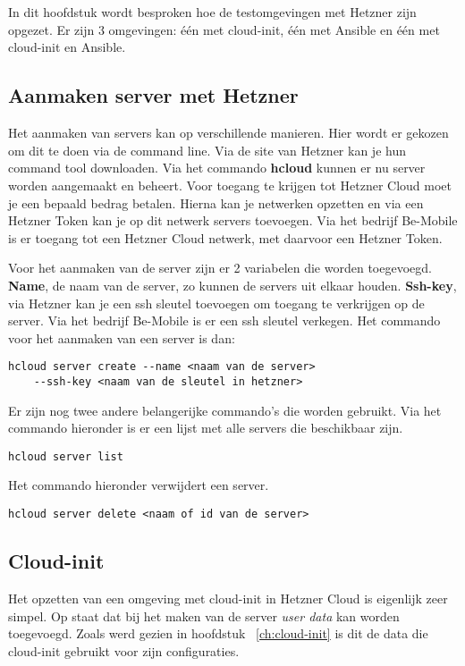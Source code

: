 \chapter{}
\label{ch:testhetzner}
In dit hoofdstuk wordt besproken hoe de testomgevingen met Hetzner zijn opgezet. Er zijn 3 omgevingen: één met cloud-init, één met Ansible en één met cloud-init en Ansible.

\section{Aanmaken server met Hetzner}
Het aanmaken van servers kan op verschillende manieren. Hier wordt er gekozen om dit te doen via de command line. Via de site van Hetzner kan je hun command tool downloaden. Via het commando \textbf{hcloud} kunnen er nu server worden aangemaakt en beheert. Voor toegang te krijgen tot Hetzner Cloud moet je een bepaald bedrag betalen. Hierna kan je netwerken opzetten en via een Hetzner Token kan je op dit netwerk servers toevoegen. Via het bedrijf Be-Mobile is er toegang tot een Hetzner Cloud netwerk, met daarvoor een Hetzner Token.

Voor het aanmaken van de server zijn er 2 variabelen die worden toegevoegd. \textbf{Name}, de naam van de server, zo kunnen de servers uit elkaar houden. \textbf{Ssh-key}, via Hetzner kan je een ssh sleutel toevoegen om toegang te verkrijgen op de server. Via het bedrijf Be-Mobile is er een ssh sleutel verkegen. Het commando  voor het aanmaken van een server is dan:
\begin{lstlisting}[basicstyle=\small]
hcloud server create --name <naam van de server> 
    --ssh-key <naam van de sleutel in hetzner>
\end{lstlisting}
\newpage
Er zijn nog twee andere belangerijke commando's die worden gebruikt. Via het commando hieronder is er een lijst met alle servers die beschikbaar zijn.
\begin{lstlisting}[basicstyle=\small]
hcloud server list
\end{lstlisting}
Het commando hieronder verwijdert een server.
\begin{lstlisting}[basicstyle=\small]
hcloud server delete <naam of id van de server>
\end{lstlisting}


\section{Cloud-init}
Het opzetten van een omgeving met cloud-init in Hetzner Cloud is eigenlijk zeer simpel. Op \autocite{hetznerWiki} staat  dat bij het maken van de server \textit{user data} kan worden toegevoegd. Zoals werd gezien in hoofdstuk ~\ref{ch:cloud-init} is dit de data die cloud-init gebruikt voor zijn configuraties.

